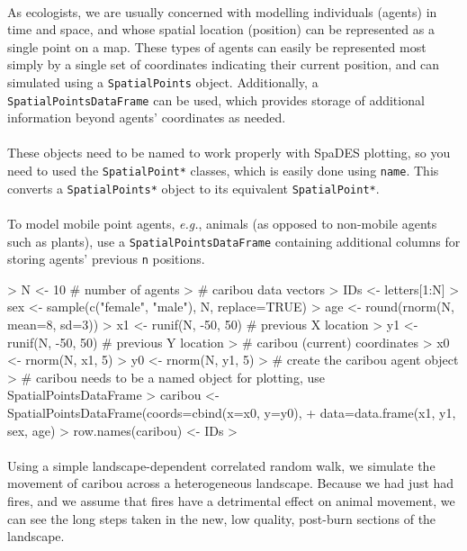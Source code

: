 \documentclass{article}
\begin{document}
\paragraph{}
As ecologists, we are usually concerned with modelling individuals (agents) in time and space, and whose spatial location (position) can be represented as a single point on a map. These types of agents can easily be represented most simply by a single set of coordinates indicating their current position, and can simulated using a \texttt{SpatialPoints} object. Additionally, a \texttt{SpatialPointsDataFrame} can be used, which provides storage of additional information beyond agents' coordinates as needed.

\paragraph{}
These objects need to be named to work properly with SpaDES plotting, so you need to used the \texttt{SpatialPoint*} classes, which is easily done using \texttt{name}. This converts a \texttt{SpatialPoints*} object to its equivalent \texttt{SpatialPoint*}.

\paragraph{}
To model mobile point agents, \textit{e.g.}, animals (as opposed to non-mobile agents such as plants), use a \texttt{SpatialPointsDataFrame} containing additional columns for storing agents' previous \texttt{n} positions.

\begin{Schunk}
\begin{Sinput}
> N <- 10 # number of agents
> # caribou data vectors
> IDs <- letters[1:N]
> sex <- sample(c("female", "male"), N, replace=TRUE)
> age <- round(rnorm(N, mean=8, sd=3))
> x1 <- runif(N, -50, 50) # previous X location
> y1 <- runif(N, -50, 50) # previous Y location
> # caribou (current) coordinates
> x0 <- rnorm(N, x1, 5)
> y0 <- rnorm(N, y1, 5)
> # create the caribou agent object
> # caribou needs to be a named object for plotting, use SpatialPointsDataFrame
> caribou <- SpatialPointsDataFrame(coords=cbind(x=x0, y=y0),
+                                   data=data.frame(x1, y1, sex, age)
> row.names(caribou) <- IDs
>
\end{Sinput}
\end{Schunk}

\paragraph{}
Using a simple landscape-dependent correlated random walk, we simulate the movement of caribou across a heterogeneous landscape. Because we had just had fires, and we assume that fires have a detrimental effect on animal movement, we can see the long steps taken in the new, low quality, post-burn sections of the landscape.
\end{document}
